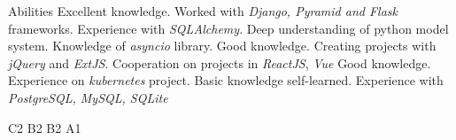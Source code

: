\begin{rubric}{Abilities}
\entry*[Python]
	Excellent knowledge.\newline
    Worked with \textit{Django, Pyramid and Flask} frameworks. Experience with
    \textit{SQLAlchemy}. Deep understanding of python model system. Knowledge
    of \textit{asyncio} library.
\entry*[JavaScript]
    Good knowledge. Creating projects with \textit{jQuery} and \textit{ExtJS}.
    Cooperation on projects in \textit{ReactJS}, \textit{Vue}
\entry*[Go]
    Good knowledge. Experience on \textit{kubernetes} project.
\entry*[Elm]
    Basic knowledge self-learned.
\entry*[Databases]
    Experience with \textit{PostgreSQL, MySQL, SQLite}

\entry*[English]
    C2
\entry*[Russian]
	B2
	B2
\entry*[Georgian]
    A1
\end{rubric}
